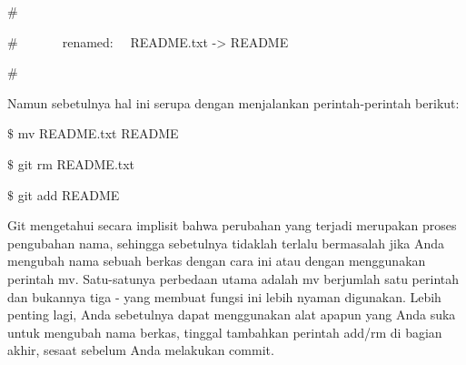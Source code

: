 \noindent 
{\fontsize{14pt}{14pt}\selectfont  $  \#  $ \\} \par
\noindent 
{\fontsize{14pt}{14pt}\selectfont  $  \#  $~~~~~~~renamed:~~  README.txt -> README \\} \par
\noindent 
{\fontsize{14pt}{14pt}\selectfont  $  \#  $ \\} \par
\noindent 
{\fontsize{14pt}{14pt}\selectfont Namun sebetulnya hal ini serupa dengan menjalankan perintah-perintah berikut: \\} \par
\noindent 
{\fontsize{14pt}{14pt}\selectfont  $  \$  $ mv README.txt README \\} \par
\noindent 
{\fontsize{14pt}{14pt}\selectfont  $  \$  $ git rm README.txt \\} \par
\noindent 
{\fontsize{14pt}{14pt}\selectfont  $  \$  $ git add README \\} \par
\noindent 
{\fontsize{14pt}{14pt}\selectfont Git mengetahui secara implisit bahwa perubahan yang terjadi merupakan proses pengubahan nama, sehingga sebetulnya tidaklah terlalu bermasalah jika Anda mengubah nama sebuah berkas dengan cara ini atau dengan menggunakan perintah $  $mv. Satu-satunya perbedaan utama adalah $  $mv $  $berjumlah satu perintah dan bukannya tiga - yang membuat fungsi ini lebih nyaman digunakan. Lebih penting lagi, Anda sebetulnya dapat menggunakan alat apapun yang Anda suka untuk mengubah nama berkas, tinggal tambahkan perintah add/rm di bagian akhir, sesaat sebelum Anda melakukan commit. \\} \par
\vspace{14pt}
\vspace{14pt}
\vspace{14pt}
\vspace{14pt}
\vspace{14pt}